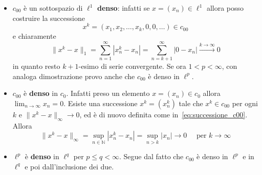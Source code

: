 \begin{itemize}[label = --]
    \item \(c_{00} \) è un sottospazio di \(\ell^{1}\) \textbf{denso}: infatti se \(x
    = {(x_{n})} \in \ell^{1}\) allora posso costruire la successione
    \begin{equation}\label{eq:successione_c00}
        x^{k} = (x_{1}, x_{2}, \dots, x_{k}, 0, 0, \dots) \in c_{00}
    \end{equation}
    e chiaramente 
    \[
        \|x^{k} - x\|_1 = \sum_{n=1}^{\infty} |x_{n}^{k} - x_{n}| =
        \sum_{n=k+1}^{\infty} |0 - x_{n}| \overset{k \to \infty}{\longrightarrow} 0
    \]
    in quanto resto \(k+1\)-esimo di serie convergente. Se ora \(1 < p <
    \infty\), con analoga dimostrazione provo anche che \(c_{00} \) è denso in
    \(\ell^{p}\).

    \item \(c_{00}\) è \textbf{denso} in \(c_{0}\). Infatti
    preso un elemento \(x = {(x_{n})} \in c_{0} \) allora \(\lim_{n \to \infty}
    x_{n} = 0\). Esiste una successione \(x^{k} = {(x_{n}^{k})}\) tale che \(x^{k} \in
    c_{00} \) per ogni \(k\) e \(\|x^{k} - x\|_\infty \to 0\), ed è di nuovo
    definita come in~\eqref{eq:successione_c00}. Allora
    \[
        \|x^{k} - x\|_\infty = \sup_{n \in \mathbb{N}} |x_{n}^{k} - x_{n}| = \sup_{n
        > k} |x_{n}| \to 0 \quad \text{ per } k \to \infty
    \]

    \item \(\ell^p\) è \textbf{denso} in \(\ell^q\) per \(p \le q < \infty\). Segue dal fatto che \(c_{00}\) è denso in \(\ell^p\) e in \(\ell^q\) e 
    poi dall'inclusione dei due.  


\end{itemize}

